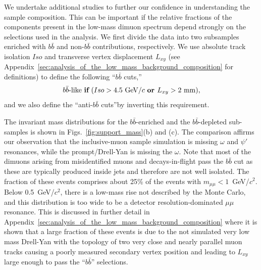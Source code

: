 We undertake additional studies to further our confidence in
understanding the sample composition. This can be important if the
relative fractions of the components present in the low-mass dimuon
spectrum depend strongly on the selections used in the analysis. We first 
divide the data into two subsamples
enriched with $b\bar{b}$ and non-$b\bar{b}$ contributions, respectively. We use
absolute track isolation $Iso$ and transverse vertex displacement
$L_{xy}$ (see
Appendix~\ref{sec:analysis_of_the_low_mass_background_composition} for
definitions) to define the following ``$b\bar{b}$ cuts,''
\begin{equation}
b\bar{b}\mbox{-like {\bf if} (} Iso > 4.5\mbox{ GeV/$c$ {\bf or }} L_{xy} > \mbox{2 mm),}
\label{eqn:bbcuts}
\end{equation}
and we also define the ``anti-$b\bar{b}$ cuts''by inverting this requirement.

The invariant mass distributions for the $b\bar{b}$-enriched and the
$b\bar{b}$-depleted sub-samples is shown in
Figs.~\ref{fig:support_mass}(b) and (c). The comparison affirms our
observation that the inclusive-muon sample simulation is missing
$\omega$ and $\psi'$ resonances, while the prompt/Drell-Yan is missing
the $\omega$. Note that most of the dimuons arising from misidentified
muons and decays-in-flight pass the $b\bar{b}$ cut as these are
typically produced inside jets and therefore are not well
isolated. The fraction of these events comprises about 25\% of the
events with $m_{\mu \mu}<1$~GeV/$c^2$.  Below 0.5~GeV/$c^2$, there is
a low-mass rise not described by the Monte Carlo, and this
distribution is too wide to be a detector resolution-dominated
$\mu\mu$ resonance. This is discussed in further detail in Appendix~\ref{sec:analysis_of_the_low_mass_background_composition} where 
it is shown that a large fraction of these events is due to the not simulated very 
low mass Drell-Yan with the topology of two very close and nearly parallel muon tracks 
causing a poorly measured secondary vertex position and leading to $L_{xy}$
large enough to pass the ``$b\bar{b}$'' selections.

